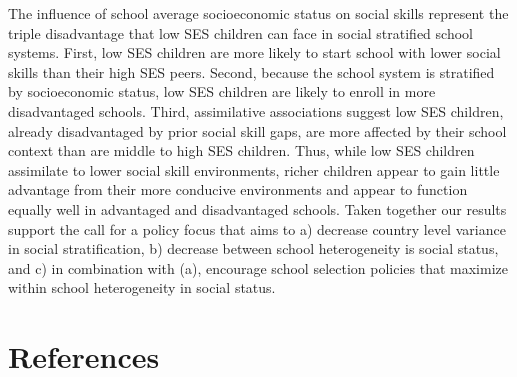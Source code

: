 \documentclass[
  english,
  man]{apa6}
\begin{document}
The influence of school average socioeconomic status on social skills represent the triple disadvantage that low SES children can face in social stratified school systems. First, low SES children are more likely to start school with lower social skills than their high SES peers. Second, because the school system is stratified by socioeconomic status, low SES children are likely to enroll in more disadvantaged schools. Third, assimilative associations suggest low SES children, already disadvantaged by prior social skill gaps, are more affected by their school context than are middle to high SES children. Thus, while low SES children assimilate to lower social skill environments, richer children appear to gain little advantage from their more conducive environments and appear to function equally well in advantaged and disadvantaged schools. Taken together our results support the call for a policy focus that aims to a) decrease country level variance in social stratification, b) decrease between school heterogeneity is social status, and c) in combination with (a), encourage school selection policies that maximize within school heterogeneity in social status.

\newpage

\hypertarget{references}{%
\section{References}\label{references}}

\begingroup
\setlength{\parindent}{-0.5in}
\setlength{\leftskip}{0.5in}
\end{document}
